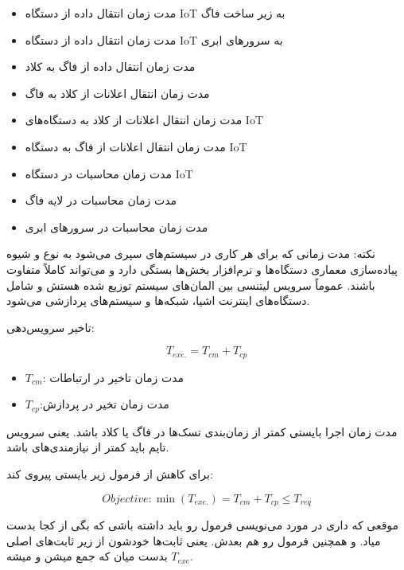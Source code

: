 \documentclass[a4paper]{article}
\begin{document}
\begin{itemize}
    \item مدت زمان انتقال داده از دستگاه IoT به زیر ساخت فاگ
    \item مدت زمان انتقال داده از دستگاه IoT به سرور‌های ابری
    \item مدت زمان انتقال داده از فاگ به کلاد
    \item مدت زمان انتقال اعلانات از کلاد به فاگ
    \item مدت زمان انتقال اعلانات از کلاد به دستگاه‌های IoT
    \item مدت زمان انتقال اعلانات از فاگ به دستگاه IoT
    \item مدت زمان محاسبات در دستگاه IoT
    \item مدت زمان محاسبات در لایه فاگ
    \item مدت زمان محاسبات در سرور‌های ابری
\end{itemize}

نکته: مدت زمانی که برای هر کاری در سیستم‌های  سپری می‌شود به نوع و شیوه
پیاده‌سازی معماری دستگاه‌ها و نرم‌افزار بخش‌ها بستگی دارد و می‌تواند کاملاً
متفاوت باشند. عموماً سرویس لیتنسی بین المان‌های سیستم  توزیع شده هستش و
شامل دستگاه‌های اینترنت اشیا، شبکه‌ها و سیستم‌های پردازشی می‌شود.

تاخیر سرویس‌دهی:

\begin{equation}
    T_{exe.} = T_{cm} + T_{cp}
\end{equation}

\begin{itemize}
    \item $T_{cm}$: مدت زمان تاخیر در ارتباطات
    \item $T_{cp}$:مدت زمان تخیر در پردازش
\end{itemize}

مدت زمان اجرا بایستی کمتر از زمان‌بندی تسک‌ها در فاگ یا کلاد باشد. یعنی سرویس
تایم باید کمتر از نیازمندی‌های  باشد.

برای کاهش  از فرمول زیر بایستی پیروی کند:

\begin{equation}
    Objective: \min (T_{exe.}) = T_{cm} + T_{cp} \leq T_{req}
\end{equation}

موقعی که داری در مورد  می‌نویسی فرمول  رو باید داشته باشی که بگی از کجا بدست میاد. و همچنین فرمول
 رو هم بعدش. یعنی ثابت‌ها خودشون از زیر ثابت‌های اصلی
بدست میان که جمع میشن و میشه $T_{exe}$.
\end{document}
